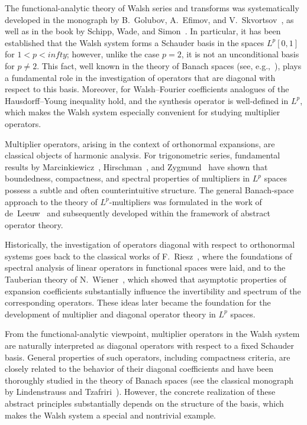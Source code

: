 \documentclass[a4paper,12pt]{article}
\theoremstyle{definition}
\theoremstyle{remark}
\theoremstyle{definition}
\def\infty{infty}%
\begin{document}
The functional-analytic theory of Walsh series and transforms
was systematically developed in the monograph
by B.~Golubov, A.~Efimov, and V.~Skvortsov~\cite{GolubovEfimovSkvortsov1991},
as well as in the book by Schipp, Wade, and Simon~\cite{SchippWadeSimon1990}.
In particular, it has been established that the Walsh system forms
a Schauder basis in the spaces $L^p[0,1]$ for $1<p<\infty$;
however, unlike the case $p=2$,
it is not an unconditional basis for $p\neq2$.
This fact, well known in the theory of Banach spaces
(see, e.g.,~\cite{Wojtaszczyk}),
plays a fundamental role in the investigation of operators
that are diagonal with respect to this basis.
Moreover, for Walsh–Fourier coefficients
analogues of the Hausdorff–Young inequality hold,
and the synthesis operator is well-defined in $L^p$,
which makes the Walsh system especially convenient
for studying multiplier operators.

Multiplier operators,
arising in the context of orthonormal expansions,
are classical objects of harmonic analysis.
For trigonometric series,
fundamental results by Marcinkiewicz~\cite{Marcinkiewicz1939},
Hirschman~\cite{Hirschman1961},
and Zygmund~\cite{Zygmund1959}
have shown that boundedness, compactness,
and spectral properties of multipliers
in $L^p$ spaces possess a subtle
and often counterintuitive structure.
The general Banach-space approach
to the theory of $L^p$-multipliers
was formulated in the work of de~Leeuw~\cite{deLeeuw1965}
and subsequently developed within the framework of abstract operator theory.

Historically, the investigation of operators
diagonal with respect to orthonormal systems
goes back to the classical works of F.~Riesz~\cite{Riesz1910},
where the foundations of spectral analysis of linear operators
in functional spaces were laid,
and to the Tauberian theory of N.~Wiener~\cite{Wiener1932},
which showed that asymptotic properties of expansion coefficients
substantially influence the invertibility and spectrum of the corresponding operators.
These ideas later became the foundation
for the development of multiplier and diagonal operator theory
in $L^p$ spaces.

From the functional-analytic viewpoint,
multiplier operators in the Walsh system
are naturally interpreted as diagonal operators
with respect to a fixed Schauder basis.
General properties of such operators,
including compactness criteria,
are closely related to the behavior of their diagonal coefficients
and have been thoroughly studied in the theory of Banach spaces
(see the classical monograph by Lindenstrauss and Tzafriri~\cite{LT}).
However, the concrete realization of these abstract principles
substantially depends on the structure of the basis,
which makes the Walsh system a special and nontrivial example.
\end{document}
